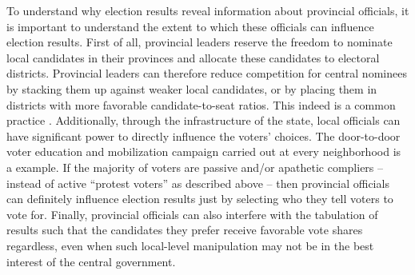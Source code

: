 \documentclass[12pt]{article}
\newcommand{\1}{\mathbbm{1}}
\begin{document}
To understand why election results reveal information about provincial officials, it is important to understand the extent to which these officials can influence election results. First of all, provincial leaders reserve the freedom to nominate local candidates in their provinces and allocate these candidates to electoral districts. Provincial leaders can therefore reduce competition for central nominees by stacking them up against weaker local candidates, or by placing them in districts with more favorable candidate-to-seat ratios. This indeed is a common practice \cite[provided confirmatory evidence for the 2007 election, which I replicated successfully for the 2011 and 2016 elections]{MaleskySchuler2011}.  Additionally, through the infrastructure of the state, local officials can have significant power to directly influence the voters' choices. The door-to-door voter education and mobilization campaign carried out at every neighborhood is a example. If the majority of voters are passive and/or apathetic compliers -- instead of active ``protest voters'' as described above -- then provincial officials can definitely influence election results just by selecting who they tell voters to vote for. Finally, provincial officials can also interfere with the tabulation of results such that the candidates they prefer receive favorable vote shares regardless, even when such local-level manipulation may not be in the best interest of the central government. 
\end{document}
